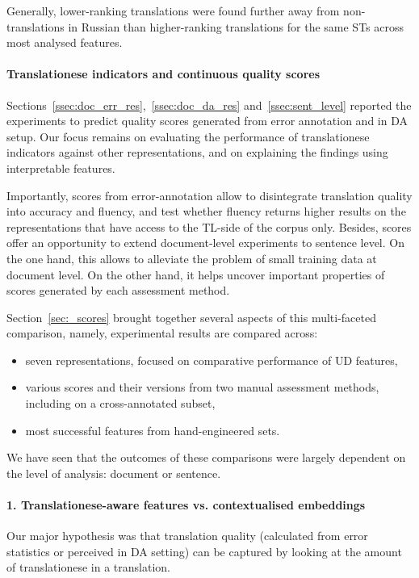 Generally, lower-ranking translations were found further away from non-translations in Russian than higher-ranking translations for the same STs across most analysed features.  
\paragraph{Translationese indicators and continuous quality scores}
Sections~\ref{ssec:doc_err_res},~\ref{ssec:doc_da_res} and~\ref{ssec:sent_level} reported the experiments to predict quality scores generated from error annotation and in DA setup. Our focus remains on evaluating the performance of translationese indicators against other representations, and on explaining the findings using interpretable features.

Importantly, scores from error-annotation allow to disintegrate translation quality into accuracy and fluency, and test whether fluency returns higher results on the representations that have access to the TL-side of the corpus only. 
Besides, scores offer an opportunity to extend document-level experiments to sentence level. On the one hand, this allows to alleviate the problem of small training data at document level. On the other hand, it helps uncover important properties of scores generated by each assessment method.

Section~\ref{sec:_scores} brought together several aspects of this multi-faceted comparison, namely, experimental results are compared across:

\begin{itemize}\compresslist{}
	\item seven representations, focused on comparative performance of UD features,
	\item various scores and their versions from two manual assessment methods, including on a cross-annotated subset,
	\item most successful features from hand-engineered sets.
\end{itemize}

We have seen that the outcomes of these comparisons were largely dependent on the level of analysis: document or sentence.

\paragraph{1. Translationese-aware features vs. contextualised embeddings}
Our major hypothesis was that translation quality (calculated from error statistics or perceived in DA setting) can be captured by looking at the amount of translationese in a translation. 

